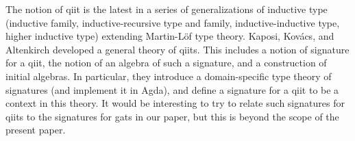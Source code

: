 \documentclass{lmcs}
\begin{document}
%


The notion of qiit is the latest in a series of generalizations of inductive type (inductive family, inductive-recursive type and family, inductive-inductive type, higher inductive type) extending Martin-Löf type theory. Kaposi, Kov{\'{a}}cs, and Altenkirch \cite{kaposi:qiits} developed a general theory of qiits. This includes a notion of signature for a qiit, the notion of an algebra of such a signature, and a construction of initial algebras. In particular, they introduce a domain-specific type theory of signatures (and implement it in Agda), and define a signature for a qiit to be a context in this theory. It would be interesting to try to relate such signatures for qiits to the signatures for gats in our paper, but this is beyond the scope of the present paper.
\end{document}
